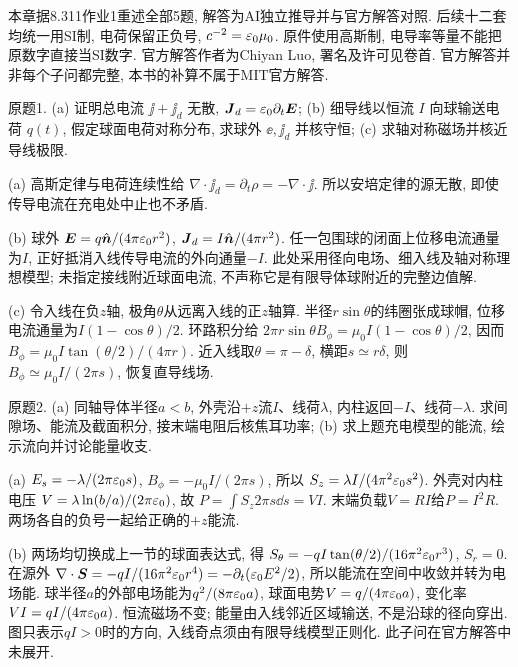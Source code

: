 \label{ch:gps1}
本章据8.311作业1重述全部5题, 解答为AI独立推导并与官方解答对照. 后续十二套均统一用SI制, 电荷保留正负号, $c^{-2}=\varepsilon_0\mu_0$. 原件使用高斯制, 电导率等量不能把原数字直接当SI数字. 官方解答作者为Chiyan Luo, 署名及许可见卷首. 官方解答并非每个子问都完整, 本书的补算不属于MIT官方解答.
\begin{exercise}
原题1. (a) 证明总电流 $\jj+\jj_d$ 无散, $\boldsymbol{J}_d=\varepsilon_0\partial_t\boldsymbol{E}$; (b) 细导线以恒流 $I$ 向球输送电荷 $q(t)$, 假定球面电荷对称分布, 求球外 $\ee,\jj_d$ 并核守恒; (c) 求轴对称磁场并核近导线极限.
\end{exercise}
\begin{solution}
(a) 高斯定律与电荷连续性给 $\nabla\cdot\jj_d=\partial_t\rho=-\nabla\cdot\jj$. 所以安培定律的源无散, 即使传导电流在充电处中止也不矛盾.

(b) 球外 $\boldsymbol{E}=q\hat{\boldsymbol{n}}/(4\pi\varepsilon_0 r^2)$, $\boldsymbol{J}_d=I\hat{\boldsymbol{n}}/(4\pi r^2)$. 任一包围球的闭面上位移电流通量为$I$, 正好抵消入线传导电流的外向通量$-I$. 此处采用径向电场、细入线及轴对称理想模型; 未指定接线附近球面电流, 不声称它是有限导体球附近的完整边值解.

(c) 令入线在负$z$轴, 极角$\theta$从远离入线的正$z$轴算. 半径$r\sin\theta$的纬圈张成球帽, 位移电流通量为$I(1-\cos\theta)/2$. 环路积分给
$2\pi r\sin\theta B_\phi=\mu_0 I(1-\cos\theta)/2$, 因而 $B_\phi=\mu_0I\tan(\theta/2)/(4\pi r)$. 近入线取$\theta=\pi-\delta$, 横距$s\simeq r\delta$, 则 $B_\phi\simeq\mu_0I/(2\pi s)$, 恢复直导线场.
\end{solution}
\begin{exercise}
原题2. (a) 同轴导体半径$a<b$, 外壳沿$+z$流$I$、线荷$\lambda$, 内柱返回$-I$、线荷$-\lambda$. 求间隙场、能流及截面积分, 接末端电阻后核焦耳功率; (b) 求上题充电模型的能流, 绘示流向并讨论能量收支.
\end{exercise}
\begin{solution}
(a) $E_s=-\lambda/(2\pi\varepsilon_0 s)$, $B_\phi=-\mu_0 I/(2\pi s)$, 所以 $S_z=\lambda I/(4\pi^2\varepsilon_0 s^2)$. 外壳对内柱电压 $V=\lambda\ln(b/a)/(2\pi\varepsilon_0)$, 故 $P=\int S_z2\pi s\dd s=VI$. 末端负载$V=RI$给$P=I^2R$. 两场各自的负号一起给正确的$+z$能流.

(b) 两场均切换成上一节的球面表达式, 得 $S_\theta=-qI\tan(\theta/2)/(16\pi^2\varepsilon_0 r^3)$, $S_r=0$. 在源外
$\nabla\cdot\boldsymbol{S}=-qI/(16\pi^2\varepsilon_0 r^4)=-\partial_t(\varepsilon_0 E^2/2)$, 所以能流在空间中收敛并转为电场能. 球半径$a$的外部电场能为$q^2/(8\pi\varepsilon_0 a)$, 球面电势$V=q/(4\pi\varepsilon_0 a)$, 变化率$VI=qI/(4\pi\varepsilon_0 a)$. 恒流磁场不变; 能量由入线邻近区域输送, 不是沿球的径向穿出. 图只表示$qI>0$时的方向, 入线奇点须由有限导线模型正则化. 此子问在官方解答中未展开.
\begin{center}\end{center}
\end{solution}
